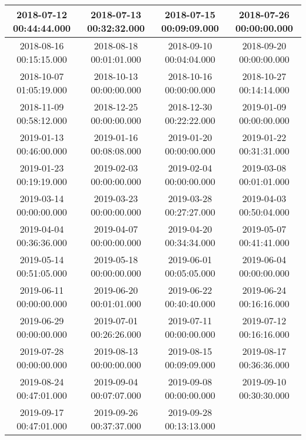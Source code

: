 \begin{longtable}{c c c c}
2018-07-12 00:44:44.000 & 
2018-07-13 00:32:32.000 & 
2018-07-15 00:09:09.000 & 
2018-07-26 00:00:00.000 \\ \midrule
2018-08-16 00:15:15.000 & 
2018-08-18 00:01:01.000 & 
2018-09-10 00:04:04.000 & 
2018-09-20 00:00:00.000 \\ \midrule
2018-10-07 01:05:19.000 & 
2018-10-13 00:00:00.000 & 
2018-10-16 00:00:00.000 & 
2018-10-27 00:14:14.000 \\ \midrule
2018-11-09 00:58:12.000 & 
2018-12-25 00:00:00.000 & 
2018-12-30 00:22:22.000 & 
2019-01-09 00:00:00.000 \\ \midrule
2019-01-13 00:46:00.000 & 
2019-01-16 00:08:08.000 & 
2019-01-20 00:00:00.000 & 
2019-01-22 00:31:31.000 \\ \midrule
2019-01-23 00:19:19.000 & 
2019-02-03 00:00:00.000 & 
2019-02-04 00:00:00.000 & 
2019-03-08 00:01:01.000 \\ \midrule
2019-03-14 00:00:00.000 & 
2019-03-23 00:00:00.000 & 
2019-03-28 00:27:27.000 & 
2019-04-03 00:50:04.000 \\ \midrule
2019-04-04 00:36:36.000 & 
2019-04-07 00:00:00.000 & 
2019-04-20 00:34:34.000 & 
2019-05-07 00:41:41.000 \\ \midrule
2019-05-14 00:51:05.000 & 
2019-05-18 00:00:00.000 & 
2019-06-01 00:05:05.000 & 
2019-06-04 00:00:00.000 \\ \midrule
2019-06-11 00:00:00.000 & 
2019-06-20 00:01:01.000 & 
2019-06-22 00:40:40.000 & 
2019-06-24 00:16:16.000 \\ \midrule
2019-06-29 00:00:00.000 & 
2019-07-01 00:26:26.000 & 
2019-07-11 00:00:00.000 & 
2019-07-12 00:16:16.000 \\ \midrule
2019-07-28 00:00:00.000 & 
2019-08-13 00:00:00.000 & 
2019-08-15 00:09:09.000 & 
2019-08-17 00:36:36.000 \\ \midrule
2019-08-24 00:47:01.000 & 
2019-09-04 00:07:07.000 & 
2019-09-08 00:00:00.000 & 
2019-09-10 00:30:30.000 \\ \midrule
2019-09-17 00:47:01.000 & 
2019-09-26 00:37:37.000 & 
2019-09-28 00:13:13.000 & 
\end{longtable}
\caption{Tabla de Fechas en UTC}
